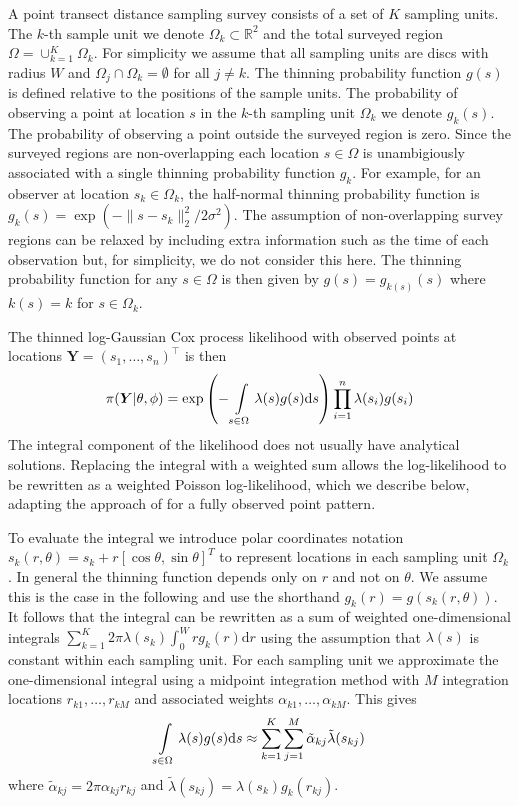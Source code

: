 \documentclass[preprint,12pt]{elsarticle}
\newcommand{\bm}{\boldsymbol}  %
\newcommand{\tl}{\tilde{\lambda}}   %
\begin{document}
A point transect distance sampling survey consists of a set of $K$ sampling units.  The $k$-th sample unit we denote $\Omega_k \subset \mathbb{R}^2$ and the total surveyed region $\Omega = \cup_{k=1}^K \Omega_k$.  For simplicity we assume that all sampling units are discs with radius $W$ and $\Omega_j \cap \Omega_k = \emptyset$ for all $j \neq k$.  The thinning probability function $g(s)$ is defined relative to the positions of the sample units.  The probability of observing a point at location $s$ in the $k$-th sampling unit $\Omega_k$ we denote $g_k(s)$.  The probability of observing a point outside the surveyed region is zero.
Since the surveyed regions are non-overlapping each location $s \in \Omega$ is unambigiously associated with a single thinning probability function $g_k$.  For example, for an observer at location $s_k \in \Omega_k$, the half-normal thinning probability function is $g_k(s) = \exp(-\lVert s - s_k \rVert_2^2 / 2\sigma^2)$. The assumption of non-overlapping survey regions can be relaxed by including extra information such as the time of each observation but, for simplicity, we do not consider this here.  The thinning probability function for any $s \in \Omega$ is then given by $g(s) = g_{k(s)}(s)$ where $k(s) = k$ for $s \in \Omega_k$.

The thinned log-Gaussian Cox process likelihood with observed points at locations $\bm{Y} = (s_1, \ldots, s_n)^\intercal$ is then
\begin{equation}
\label{lgcp-likelihood}
\pi(\bm{Y} | \theta, \phi) = \exp\left(-\int\displaylimits_{s \in \Omega} \lambda(s) g(s) \mathrm{d}s \right)\prod_{i=1}^n \lambda(s_i)g(s_i)
\end{equation}
The integral component of the likelihood does not usually have analytical solutions.  Replacing the integral with a weighted sum allows the log-likelihood to be rewritten as a weighted Poisson log-likelihood, which we describe below, adapting the approach of \cite{simpson_going_2016} for a fully observed point pattern.

To evaluate the integral we introduce polar coordinates notation $s_k(r, \theta) = s_k + r\left[\cos\theta, \sin\theta \right]^T$ to represent locations in each sampling unit $\Omega_k$.   In general the thinning function depends only on $r$ and not on $\theta$.  We assume this is the case in the following and use the shorthand $g_k(r) = g(s_k(r, \theta))$. It follows that the integral can be rewritten as a sum of weighted one-dimensional integrals $\sum_{k=1}^K 2\pi \lambda(s_k) \int_0^W r g_k(r)\mathrm{d}r$ using the assumption that $\lambda(s)$ is constant within each sampling unit.  For each sampling unit we approximate the one-dimensional integral using a midpoint integration method with $M$ integration locations $r_{k1}, \ldots, r_{kM}$ and associated weights $\alpha_{k1}, \ldots, \alpha_{kM}$.  This gives
\begin{equation*}
	\int\displaylimits_{s \in \Omega} \lambda(s)g(s)\mathrm{d}s \approx \sum_{k=1}^K \sum_{j=1}^M \tilde{\alpha}_{kj} \tl(s_{kj})
\end{equation*}
where $\tilde{\alpha}_{kj} = 2\pi \alpha_{kj}r_{kj}$ and $\tl(s_{kj}) = \lambda(s_k) g_k(r_{kj})$.
\end{document}
